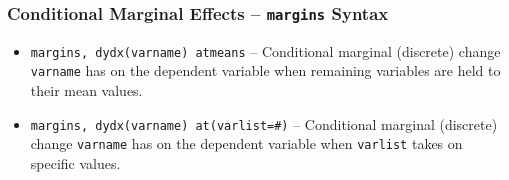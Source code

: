 \documentclass{beamer}
\begin{document}
\begin{frame}
	\frametitle{Conditional Marginal Effects -- \texttt{margins} Syntax}
	\begin{itemize}
		\item \texttt{margins, dydx(varname) atmeans} -- Conditional marginal (discrete) change \texttt{varname} has on the dependent variable when remaining variables are held to their mean values.
		\item \texttt{margins, dydx(varname) at(varlist=\#)} -- Conditional marginal (discrete) change \texttt{varname} has on the dependent variable when \texttt{varlist} takes on specific values.
	\end{itemize}
\end{frame}
\end{document}

